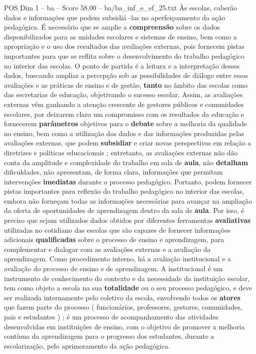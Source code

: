 \begin{textsample}{POS Dim 1 – ba – Score 58.00 – ba/ba\_inf\_e\_ef\_25.txt}
Às escolas, caberão dados e informações que podem subsidiá -las no aperfeiçoamento da ação pedagógica.
É necessário que se amplie a \textbf{compreensão} sobre os dados disponibilizados para as unidades escolares e sistemas de ensino, bem como a apropriação e o uso dos resultados das avaliações externas, pois fornecem pistas importantes para que se reflita sobre o desenvolvimento do trabalho pedagógico no interior das escolas.
O ponto de partida é a leitura e a interpretação desses dados, buscando ampliar a percepção sob as possibilidades de diálogo entre essas avaliações e as práticas de ensino e de gestão, \textbf{tanto} no âmbito das escolas como das secretarias de educação, objetivando o sucesso escolar.
Assim, as avaliações externas vêm ganhando a atenção crescente de gestores públicos e comunidades escolares, por deixarem claro um compromisso com os resultados da educação e fornecerem \textbf{parâmetros} objetivos para o \textbf{debate} sobre a melhoria da qualidade no ensino, bem como a utilização dos dados e das informações produzidas pelas avaliações externas, que podem \textbf{subsidiar} e criar novas perspectivas em relação a diretrizes e políticas educacionais ; entretanto, as avaliações externas não dão conta da amplitude e complexidade do trabalho em sala de \textbf{aula}, não \textbf{detalham} dificuldades, não apresentam, de forma clara, informações que permitam intervenções \textbf{imediatas} durante o processo pedagógico.
Portanto, podem fornecer pistas importantes para reflexão do trabalho pedagógico no interior das escolas, embora não forneçam todas as informações necessárias para avançar na ampliação da oferta de oportunidades de aprendizagem dentro da sala de \textbf{aula}.
Por isso, é preciso que sejam utilizados dados obtidos por diferentes ferramentas \textbf{avaliativas} utilizadas no cotidiano das escolas que são capazes de fornecer informações adicionais \textbf{qualificadas} sobre o processo de ensino e aprendizagem, para complementar e dialogar com as avaliações externas e a avaliação da aprendizagem.
Como procedimento interno, há a avaliação institucional e a avaliação do processo de ensino e de aprendizagem.
A institucional é um instrumento de conhecimento do contexto e da necessidade da instituição escolar, tem como objeto a escola na sua \textbf{totalidade} ou o seu processo pedagógico, e deve ser realizada internamente pelo coletivo da escola, envolvendo todos os \textbf{atores} que fazem parte do processo ( funcionários, professores, gestores, comunidades, pais e estudantes ) ; é um processo de acompanhamento das atividades desenvolvidas em instituições de ensino, com o objetivo de promover a melhoria contínua da aprendizagem para o progresso dos estudantes, durante a escolarização, pelo aprimoramento da ação pedagógica.

\end{textsample}
